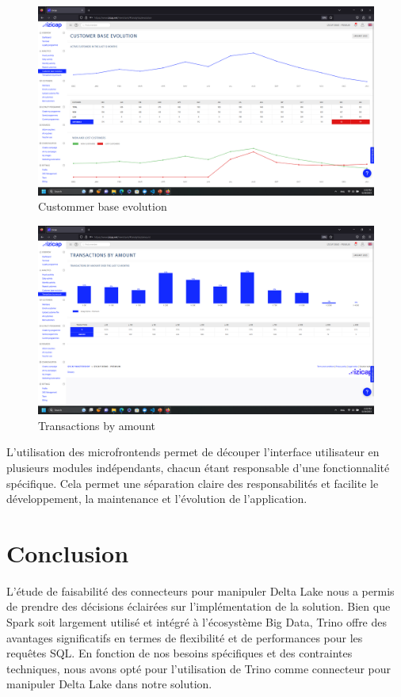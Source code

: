 \begin{figure}[H]
\centering
\includegraphics[width=\linewidth]{images/data-1.png}
\caption{Custommer base evolution}\label{fig:izicap-3}
\end{figure}
    
\begin{figure}[H]
\centering
\includegraphics[width=\linewidth]{images/data-2.png}
\caption{Transactions by amount}\label{fig:izicap-4}
\end{figure}
        
L'utilisation des microfrontends permet de découper l'interface utilisateur en plusieurs modules indépendants, chacun étant responsable d'une fonctionnalité spécifique. Cela permet une séparation claire des responsabilités et facilite le développement, la maintenance et l'évolution de l'application.

\section*{Conclusion}
L'étude de faisabilité des connecteurs pour manipuler Delta Lake nous a permis de prendre des décisions éclairées sur l'implémentation de la solution. Bien que Spark soit largement utilisé et intégré à l'écosystème Big Data, Trino offre des avantages significatifs en termes de flexibilité et de performances pour les requêtes SQL. En fonction de nos besoins spécifiques et des contraintes techniques, nous avons opté pour l'utilisation de Trino comme connecteur pour manipuler Delta Lake dans notre solution.